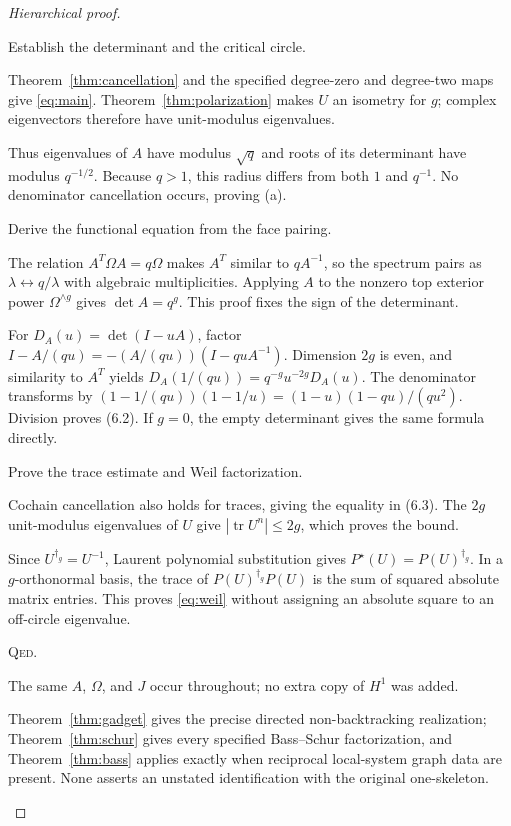 \documentclass[11pt,a4paper]{article}
\theoremstyle{remark}\newtheorem{remark}[definition]{Remark}
\newcommand{\tr}{\operatorname{tr}}\newcommand{\im}{\operatorname{im}}
\newcommand{\QED}{\textsc{Qed}}
\begin{document}
\begin{proof}[Hierarchical proof]
\begin{steps}
\item Establish the determinant and the critical circle.
\begin{steps}
\item Theorem~\ref{thm:cancellation} and the specified degree-zero and degree-two maps give \eqref{eq:main}. Theorem~\ref{thm:polarization} makes $U$ an isometry for $g$; complex eigenvectors therefore have unit-modulus eigenvalues.
\item Thus eigenvalues of $A$ have modulus $\sqrt q$ and roots of its determinant have modulus $q^{-1/2}$. Because $q>1$, this radius differs from both $1$ and $q^{-1}$. No denominator cancellation occurs, proving (a).
\end{steps}
\item Derive the functional equation from the face pairing.
\begin{steps}
\item The relation $A^T\Omega A=q\Omega$ makes $A^T$ similar to $qA^{-1}$, so the spectrum pairs as $\lambda\leftrightarrow q/\lambda$ with algebraic multiplicities. Applying $A$ to the nonzero top exterior power $\Omega^{\wedge g}$ gives $\det A=q^g$. This proof fixes the sign of the determinant.
\item For $D_A(u)=\det(I-uA)$, factor $I-A/(qu)=-(A/(qu))(I-quA^{-1})$. Dimension $2g$ is even, and similarity to $A^T$ yields
$D_A(1/(qu))=q^{-g}u^{-2g}D_A(u)$.
The denominator transforms by
$(1-1/(qu))(1-1/u)=(1-u)(1-qu)/(qu^2)$.
Division proves (6.2). If $g=0$, the empty determinant gives the same formula directly.
\end{steps}
\item Prove the trace estimate and Weil factorization.
\begin{steps}
\item Cochain cancellation also holds for traces, giving the equality in (6.3). The $2g$ unit-modulus eigenvalues of $U$ give $|\tr U^n|\le2g$, which proves the bound.
\item Since $U^{\dagger_g}=U^{-1}$, Laurent polynomial substitution gives $P^\star(U)=P(U)^{\dagger_g}$. In a $g$-orthonormal basis, the trace of $P(U)^{\dagger_g}P(U)$ is the sum of squared absolute matrix entries. This proves \eqref{eq:weil} without assigning an absolute square to an off-circle eigenvalue.
\end{steps}
\item \QED.
\begin{steps}
\item The same $A$, $\Omega$, and $J$ occur throughout; no extra copy of $H^1$ was added.
\item Theorem~\ref{thm:gadget} gives the precise directed non-backtracking realization; Theorem~\ref{thm:schur} gives every specified Bass--Schur factorization, and Theorem~\ref{thm:bass} applies exactly when reciprocal local-system graph data are present. None asserts an unstated identification with the original one-skeleton.
\end{steps}
\end{steps}
\end{proof}
\end{document}
